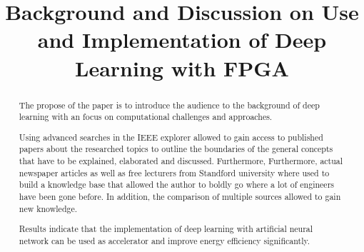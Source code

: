 \documentclass[conference]{IEEEtran}
\begin{document}
\title{Background and Discussion on Use and Implementation of Deep Learning with FPGA\\
}

\author{
}

\maketitle

\begin{abstract}
The propose of the paper is to introduce the audience to the background of deep learning with an focus on computational challenges and approaches.

Using advanced searches in the IEEE explorer allowed to gain access to published papers about the researched topics to outline the boundaries of the general concepts that have to be explained, elaborated and discussed. Furthermore, Furthermore, actual newspaper articles as well as free lecturers from Standford university where used to build a knowledge base that allowed the author to boldly go where a lot of engineers have been gone before. In addition, the comparison of multiple sources allowed to gain new knowledge.

Results indicate that the implementation of deep learning with artificial neural network can be used as accelerator and improve energy efficiency significantly.
\end{abstract}
\end{document}
